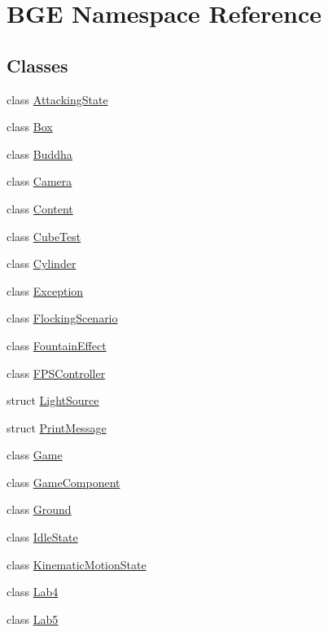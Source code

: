 \hypertarget{namespace_b_g_e}{\section{B\-G\-E Namespace Reference}
\label{namespace_b_g_e}
}
\subsection*{Classes}
\begin{DoxyCompactItemize}
\item 
class \hyperlink{class_b_g_e_1_1_attacking_state}{Attacking\-State}
\item 
class \hyperlink{class_b_g_e_1_1_box}{Box}
\item 
class \hyperlink{class_b_g_e_1_1_buddha}{Buddha}
\item 
class \hyperlink{class_b_g_e_1_1_camera}{Camera}
\item 
class \hyperlink{class_b_g_e_1_1_content}{Content}
\item 
class \hyperlink{class_b_g_e_1_1_cube_test}{Cube\-Test}
\item 
class \hyperlink{class_b_g_e_1_1_cylinder}{Cylinder}
\item 
class \hyperlink{class_b_g_e_1_1_exception}{Exception}
\item 
class \hyperlink{class_b_g_e_1_1_flocking_scenario}{Flocking\-Scenario}
\item 
class \hyperlink{class_b_g_e_1_1_fountain_effect}{Fountain\-Effect}
\item 
class \hyperlink{class_b_g_e_1_1_f_p_s_controller}{F\-P\-S\-Controller}
\item 
struct \hyperlink{struct_b_g_e_1_1_light_source}{Light\-Source}
\item 
struct \hyperlink{struct_b_g_e_1_1_print_message}{Print\-Message}
\item 
class \hyperlink{class_b_g_e_1_1_game}{Game}
\item 
class \hyperlink{class_b_g_e_1_1_game_component}{Game\-Component}
\item 
class \hyperlink{class_b_g_e_1_1_ground}{Ground}
\item 
class \hyperlink{class_b_g_e_1_1_idle_state}{Idle\-State}
\item 
class \hyperlink{class_b_g_e_1_1_kinematic_motion_state}{Kinematic\-Motion\-State}
\item 
class \hyperlink{class_b_g_e_1_1_lab4}{Lab4}
\item 
class \hyperlink{class_b_g_e_1_1_lab5}{Lab5}

\end{DoxyCompactItemize}

